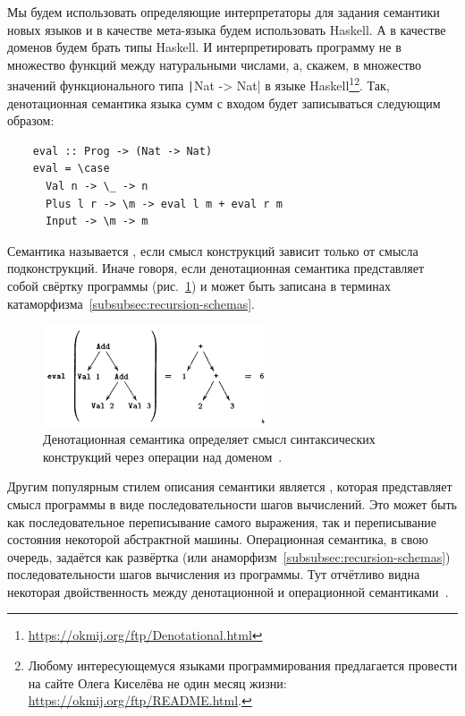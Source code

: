 Мы будем использовать определяющие интерпретаторы для задания семантики новых языков и в качестве мета-языка будем использовать Haskell.
А в качестве доменов будем брать типы Haskell.
И интерпретировать программу не в множество функций между натуральными числами, а, скажем, в множество значений функционального типа \texttt|Nat -> Nat| в языке Haskell\footnote{\url{https://okmij.org/ftp/Denotational.html}}\footnote{Любому интересующемуся языками программирования предлагается провести на сайте Олега Киселёва не один месяц жизни: \url{https://okmij.org/ftp/README.html}.}. %
Так, денотационная семантика языка сумм с входом будет записываться следующим образом:
\begin{verbatim}
    eval :: Prog -> (Nat -> Nat)
    eval = \case
      Val n -> \_ -> n
      Plus l r -> \m -> eval l m + eval r m
      Input -> \m -> m
\end{verbatim}

Семантика называется , если смысл конструкций зависит только от смысла подконструкций.
Иначе говоря, если денотационная семантика представляет собой свёртку программы (рис.\ \ref{fig:eval-prog}) и может быть записана в терминах катаморфизма~\ref{subsubsec:recursion-schemas}.

\begin{figure}[h]
    \centering
    \includegraphics[width=0.6\textwidth]{figs/eval-prog}
    \caption{Денотационная семантика определяет смысл синтаксических конструкций через операции над доменом~\cite{hutton1998fold}.}
    \label{fig:eval-prog}
\end{figure}

Другим популярным стилем описания семантики является , которая представляет смысл программы в виде последовательности шагов вычислений.
Это может быть как последовательное переписывание самого выражения, так и переписывание состояния некоторой абстрактной машины.
Операционная семантика, в свою очередь, задаётся как развёртка (или анаморфизм~\ref{subsubsec:recursion-schemas}) последовательности шагов вычисления из программы.
Тут отчётливо видна некоторая двойственность между денотационной и операционной семантиками~\cite{hutton1998fold}.

